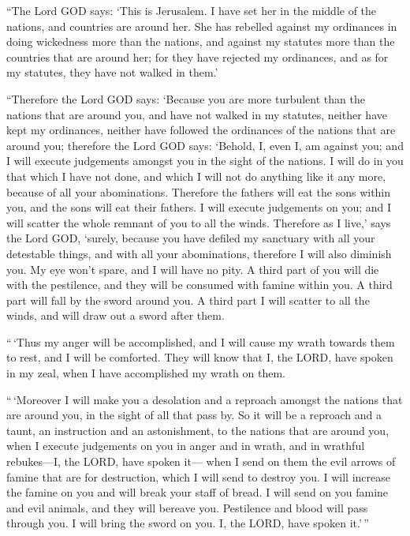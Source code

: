  ``The Lord GOD says: `This is Jerusalem. I have set her in
the middle of the nations, and countries are around her. 
She has rebelled against my ordinances in doing wickedness more than the
nations, and against my statutes more than the countries that are around
her; for they have rejected my ordinances, and as for my statutes, they
have not walked in them.'

 ``Therefore the Lord GOD says: `Because you are more
turbulent than the nations that are around you, and have not walked in
my statutes, neither have kept my ordinances, neither have followed the
ordinances of the nations that are around you;  therefore
the Lord GOD says: `Behold, I, even I, am against you; and I will
execute judgements amongst you in the sight of the nations. 
I will do in you that which I have not done, and which I will not do
anything like it any more, because of all your abominations.
 Therefore the fathers will eat the sons within you, and
the sons will eat their fathers. I will execute judgements on you; and I
will scatter the whole remnant of you to all the winds. 
Therefore as I live,' says the Lord GOD, `surely, because you have
defiled my sanctuary with all your detestable things, and with all your
abominations, therefore I will also diminish you. My eye won't spare,
and I will have no pity.  A third part of you will die with
the pestilence, and they will be consumed with famine within you. A
third part will fall by the sword around you. A third part I will
scatter to all the winds, and will draw out a sword after them.

 ``\,`Thus my anger will be accomplished, and I will cause
my wrath towards them to rest, and I will be comforted. They will know
that I, the LORD, have spoken in my zeal, when I have accomplished my
wrath on them.

 ``\,`Moreover I will make you a desolation and a reproach
amongst the nations that are around you, in the sight of all that pass
by.  So it will be a reproach and a taunt, an instruction
and an astonishment, to the nations that are around you, when I execute
judgements on you in anger and in wrath, and in wrathful rebukes---I,
the LORD, have spoken it---  when I send on them the evil
arrows of famine that are for destruction, which I will send to destroy
you. I will increase the famine on you and will break your staff of
bread.  I will send on you famine and evil animals, and
they will bereave you. Pestilence and blood will pass through you. I
will bring the sword on you. I, the LORD, have spoken it.'\,''

